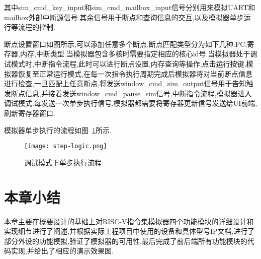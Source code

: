 其中sim\_cmd\_key\_input和sim\_cmd\_mailbox\_input信号分别用来模拟UART和mailbox外部中断源信号.其余信号用于断点和查询信息的交互,以及模拟器单步运行等流程的控制.


断点设置窗口如图所示,可以添加任意多个断点,断点匹配类型分为如下几种:PC,寄存器,内存,中断类型.当模拟器包含多核时需要指定相应的核心id号.当模拟器处于调试模式时,中断指令流程,此时可以进行断点设置,内存查询等操作,点击运行按键,模拟器恢复至正常运行模式,在每一次指令执行周期完成后模拟器将对当前断点信息进行检查,一旦匹配上任意断点,将发送window\_cmd\_sim\_output信号用于告知触发断点信息,并接着发送window\_cmd\_pause\_sim信号,中断指令流程,模拟器进入调试模式.每发送一次单步执行信号,模拟器都需要将寄存器更新信号发送给UI前端,刷新寄存器窗口.


模拟器单步执行的流程如图~\ref{fig:step}所示.
\begin{figure}[h]
    \centering
    \texttt{[image: step-logic.png]}
    \caption{调试模式下单步执行流程}
    \label{fig:step}
\end{figure}


\section{本章小结}
本章主要在概要设计的基础上对RISC-V指令集模拟器四个功能模块的详细设计和实现细节进行了阐述,并根据实际工程项目中使用的设备和具体型号IP文档,进行了部分外设的功能模拟,验证了模拟器的可用性,最后完成了前后端所有功能模块的代码实现,并给出了相应的演示效果图.


